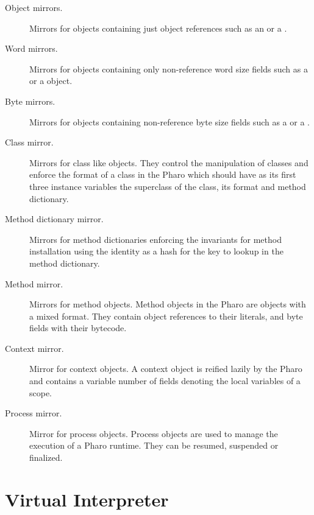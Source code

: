 \begin{description}
\item[Object mirrors.] Mirrors for objects containing just object references such as an  or a .
\item[Word mirrors.] Mirrors for objects containing only non-reference word size fields such as a  or a  object.
\item[Byte mirrors.] Mirrors for objects containing non-reference byte size fields such as a  or a . 
\item[Class mirror.] Mirrors for class like objects. They control the manipulation of classes and enforce the format of a class in the Pharo \VM which should have as its first three instance variables the superclass of the class, its format and method dictionary.
\item[Method dictionary mirror.] Mirrors for method dictionaries enforcing the \VM invariants for method installation \ie using the identity as a hash for the key to lookup in the method dictionary.
\item[Method mirror.] Mirrors for method objects. Method objects in the Pharo \VM are objects with a mixed format. They contain object references to their literals, and byte fields with their bytecode.
\item[Context mirror.] Mirror for context objects. A context object is reified lazily by the Pharo \VM and contains a variable number of fields denoting the local variables of a scope.
\item[Process mirror.] Mirror for process objects. Process objects are used to manage the execution of a Pharo runtime. They can be resumed, suspended or finalized.
\end{description}



\section{\Vtt Virtual Interpreter}%

